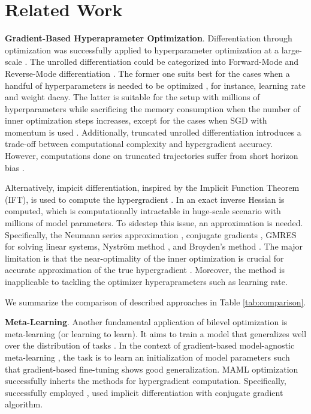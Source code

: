 \section{Related Work}
\textbf{Gradient-Based Hyperaprameter Optimization}. Differentiation through optimization \cite{domke2012generic} was successfully applied to hyperparameter optimization at a large-scale \cite{maclaurin2015gradient}. The unrolled differentiation could be categorized into Forward-Mode and Reverse-Mode differentiation \cite{franceschi2017forward}. The former one suits best for the cases when a handful of hyperparameters is needed to be optimized \cite{micaelli2020non}, for instance, learning rate and weight dacay. The latter is suitable for the setup with millions of hyperparameters while sacrificing the memory consumption when the number of inner optimization steps increases, except for the cases when SGD with momentum is used \cite{maclaurin2015gradient}. Additionally, truncated unrolled differentiation \cite{shaban2019truncated} introduces a trade-off between computational complexity and hypergradient accuracy. However, computations done on truncated trajectories suffer from short horizon bias \cite{wu2018understanding}.

Alternatively, impicit differentiation, inspired by the Implicit Function Theorem (IFT), is used to compute the hypergradient \cite{bengio2000gradient, lorraine2020optimizing, pedregosa2016hyperparameter, luketina2016scalable}.
In \cite{bengio2000gradient} an exact inverse Hessian is computed, which is computationally intractable in huge-scale scenario with millions of model parameters. To sidestep this issue, an approximation is needed. Specifically, the Neumann series approximation \cite{lorraine2020optimizing}, conjugate gradients \cite{pedregosa2016hyperparameter}, GMRES \cite{blondel2022efficient} for solving linear systems, Nystr{\"o}m method \cite{hataya2023nystrom}, and Broyden's method \cite{hao2022bi}. The major limitation is that the near-optimality of the inner optimization is crucial for accurate approximation of the true hypergradient \cite{grazzi2020iteration, blondel2022efficient}. Moreover, the method is inapplicable to tackling the optimizer hyperaprameters such as learning rate.

We summarize the comparison of described approaches in Table \ref{tab:comparison}.


\textbf{Meta-Learning}. Another fundamental application of bilevel optimization is meta-learning \cite{schmidhuber1987evolutionary} (or learning to learn). It aims to train a model that generalizes well over the distribution of tasks \cite{ravi2016optimization}. In the context of gradient-based model-agnostic meta-learning \cite{finn2017model}, the task is to learn an initialization of model parameters such that gradient-based fine-tuning shows good generalization. MAML optimization successfully inherts the methods for hypergradient computation. Specifically,  \cite{li2018learning} successfully employed \cite{luketina2016scalable}, \cite{rajeswaran2019meta} used implicit differentiation with conjugate gradient algorithm.